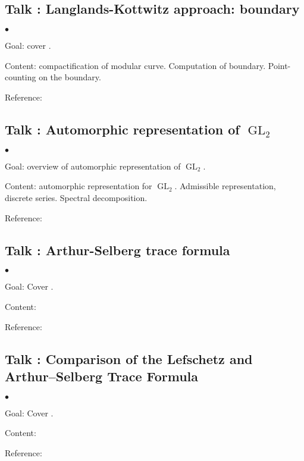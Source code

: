 \documentclass[a4paper, reqno]{amsart} %
\theoremstyle{definition}
\numberwithin{equation}{section}
\newenvironment{altitemize}
	{\begin{list}
			{$\bullet$}
			{\setlength{\labelwidth}{0pt}
				\setlength{\itemindent}{5pt}
				\setlength{\labelsep}{5pt}
				\setlength{\leftmargin}{0pt}
				\setlength{\itemsep}{\the\smallskipamount}
		}}
		{\end{list}}
\newcommand{\GL}{\operatorname{GL}}
\begin{document}
\subsection{Talk : Langlands-Kottwitz approach: boundary}
\begin{altitemize}
\item[Goal:] cover \cite[\S 11]{Scholze-MC}.
\item[Content:] compactification of modular curve. Computation of boundary. Point-counting on the boundary.
\item[Reference:] 
\end{altitemize}


\subsection{Talk : Automorphic representation of $\GL_2$}
\begin{altitemize}
\item[Goal:] overview of automorphic representation of $\GL_2$.
\item[Content:] automorphic representation for $\GL_2$. Admissible representation, discrete series. Spectral decomposition.
\item[Reference:] 
\end{altitemize}


\subsection{Talk : Arthur-Selberg trace formula}
\begin{altitemize}
\item[Goal:] Cover \cite[\S 12]{Scholze-MC}.
\item[Content:] 
\item[Reference:] 
\end{altitemize}



\subsection{Talk : Comparison of the Lefschetz and Arthur–Selberg Trace Formula}
\begin{altitemize}
\item[Goal:] Cover \cite[\S 13]{Scholze-MC}.
\item[Content:] 
\item[Reference:] 
\end{altitemize}






		
\end{document}
